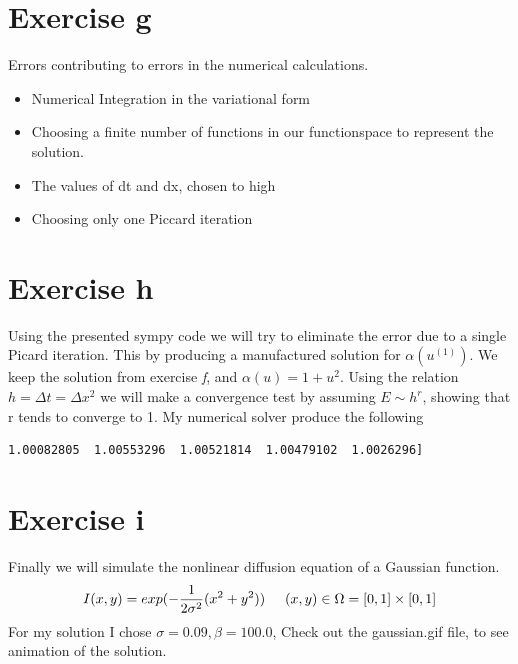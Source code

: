 \documentclass[a4paper,norsk]{article}
\begin{document}
\section*{Exercise g}
Errors contributing to errors in the numerical calculations.
\begin{itemize}
\item Numerical Integration in the variational form
\item Choosing a finite number of functions in our functionspace to represent the solution.
\item The values of dt and dx, chosen to high
\item Choosing only one Piccard iteration
\end{itemize}

\section*{Exercise h}
Using the presented sympy code we will try to eliminate the error due to a single Picard iteration. This by
producing a manufactured solution for $\alpha(u^{(1)})$. We keep the solution from exercise \textit{f}, and 
$\alpha(u) = 1 + u^2 $. Using the relation $h=\Delta t = \Delta x^2$ we will make a convergence test by assuming 
$E \sim h^r$, showing that r tends to converge to 1. My numerical solver produce the following

\begin{lstlisting}[style = terminal]
 1.00082805  1.00553296  1.00521814  1.00479102  1.0026296]
\end{lstlisting}

\newpage
\section*{Exercise i}
Finally we will simulate the nonlinear diffusion equation of a Gaussian function. 
\begin{align}
I(x,y) = exp(-\frac{1}{2\sigma^2} (x^2+y^2) ) 
\hspace{5mm}
(x,y) \in \Omega = [0,1] \times [0,1]
\end{align}
For my solution I chose $\sigma = 0.09, \beta = 100.0$,
Check out the gaussian.gif file, to see animation of the solution. 
\end{document}
